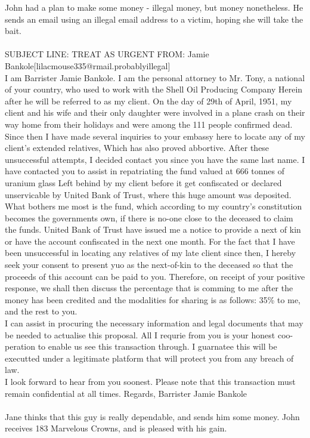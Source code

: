 \documentclass{article}
\begin{document}
John had a plan to make some money {-} illegal money, but money nonetheless.
He sends an email using an illegal email address to a victim, hoping she will take the bait.
\\\\
SUBJECT LINE: TREAT AS URGENT
FROM: Jamie Bankole[lilacmouse335@rmail.probablyillegal]
\\
I am Barrister Jamie Bankole.
I am the personal attorney to Mr. Tony, a national of your country, who used to work with the Shell Oil Producing Company
Herein after he will be referred to as my client.
On the day of 29th of April, 1951, my client and his wife and their only daughter were involved in a plane crash on their way home from their holidays and were among the 111 people confirmed dead.
\\
Since then I have made several inquiries to your embassy here to locate any of my client's extended relatives, Which has also proved abbortive.
After these unsuccessful attempts, I decided contact you since you have the same last name.
I have contacted you to assist in repatriating the fund valued at 666 tonnes of uranium glass Left behind by my client before it get confiscated or declared unservicable by United Bank of Trust, where this huge amount was deposited.
\\
What bothers me most is the fund, which according to my country's constitution becomes the governments own, if there is no{-}one close to the deceased to claim the funds.
United Bank of Trust have issued me a notice to provide a next of kin or have the account confiscated in the next one month.
For the fact that I have been unsuccessful in locating any relatives of my late client since then, I hereby seek your consent to present yuo as the next{-}of{-}kin to the deceased so that the proceeds of this account can be paid to you.
Therefore, on receipt of your positive response, we shall then discuss the percentage that is comming to me after the money has been credited and the modalities for sharing is as follows: 35\% to me, and the rest to you.
\\
I can assist in procuring the necessary information and legal documents that may be needed to actualise this proposal.
All I requrie from you is your honest coo{-}peration to enable us see this transaction through.
I guarnatee this will be executted under a legitimate platform that will protect you from any breach of law.
\\
I look forward to hear from you soonest.
Please note that this transaction must remain confidential at all times.
Regards, Barrister Jamie Bankole
\\\\
Jane thinks that this guy is really dependable, and sends him some money.
John receives 183 Marvelous Crowns, and is pleased with his gain.
\end{document}
